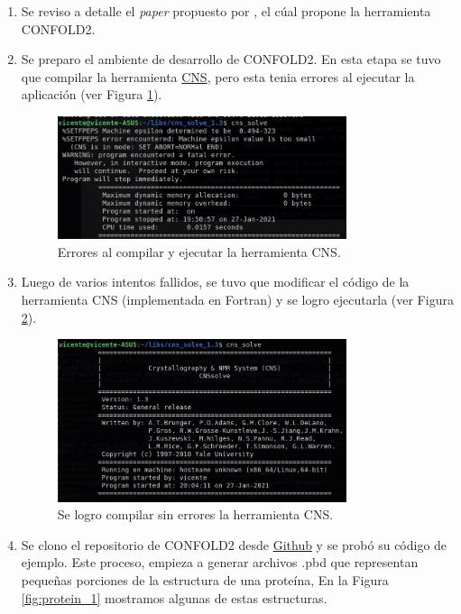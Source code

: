 \documentclass{article}
\begin{document}
	\begin{enumerate}
		\item Se reviso a detalle el \textit{paper} propuesto por  \cite{adhikari2018confold2}, el cúal propone la herramienta CONFOLD2. 
		\item Se preparo el ambiente de desarrollo de CONFOLD2. En esta etapa se tuvo que compilar la herramienta  \href{http://cns-online.org/v1.3/}{CNS}, pero esta tenia errores al ejecutar la aplicación (ver Figura \ref{fig:cns_error}). 
		
		\begin{figure}
			\centering
			\includegraphics[width=0.8\textwidth]{img/papers/cns_problem}
			\caption{Errores al compilar y ejecutar la herramienta CNS.}
			\label{fig:cns_error}
		\end{figure}
		
		\item Luego de varios intentos fallidos, se tuvo que modificar el código de la herramienta CNS (implementada en Fortran) y se logro ejecutarla (ver Figura \ref{fig:cns}).
		
		\begin{figure}
			\centering
			\includegraphics[width=0.8\textwidth]{img/papers/cns}
			\caption{Se logro compilar sin errores la herramienta CNS.}
			\label{fig:cns}
		\end{figure}
	
		\item Se clono el repositorio de CONFOLD2 desde \href{https://github.com/multicom-toolbox/CONFOLD2}{Github} y se probó su código de ejemplo. Este proceso, empieza a generar archivos .pbd que representan pequeñas porciones de la estructura de una proteína, En la Figura \ref{fig:protein_1} mostramos algunas de estas estructuras. 
		

\end{enumerate}
\end{document}
